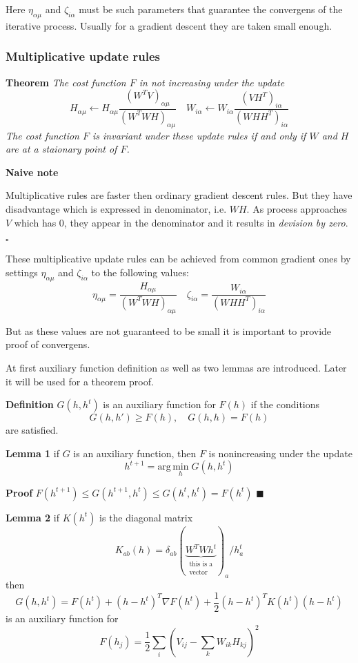\documentclass[oneside, final, 14pt]{extarticle}
\begin{document}
Here $\eta_{\alpha\mu}$ and $\zeta_{i\alpha}$ must be such parameters
that guarantee the convergens of the iterative process.
Usually for a gradient descent they are taken small enough.

\subsubsection{Multiplicative update rules}

\textbf{Theorem} \textit{ The cost function $F$ in not increasing under
the update
\[
  H_{\alpha\mu} \leftarrow H_{\alpha\mu}
  \frac{(W^TV)_{\alpha\mu}}{(W^TWH)_{\alpha\mu}} \quad
  W_{i\alpha} \leftarrow W_{i\alpha}
  \frac{(VH^T)_{i\alpha}}{(WHH^T)_{i\alpha}}
\]
The cost function $F$ is invariant under these update rules if and only if
$W$ and $H$ are at a staionary point of $F$.
}

\textbf{Naive note}

Multiplicative rules are faster
then ordinary gradient descent rules.
But they have disadvantage which is expressed
in denominator, i.e. $WH$. As process approaches
$V$ which has 0, they appear in the denominator
and it results in {\it devision by zero}.

$\square$

These multiplicative update rules can be achieved from common gradient
ones by settings $\eta_{\alpha\mu}$ and $\zeta_{i\alpha}$ to
the following values:
\[
  \eta_{\alpha\mu} =
  \frac {H_{\alpha\mu}}
        {(W^TWH)_{\alpha\mu}} \quad
  \zeta_{i\alpha} =
  \frac {W_{i\alpha}}
        {(WHH^T)_{i\alpha}}
\]

But as these values are not guaranteed to be small it is important
to provide proof of convergens.

At first auxiliary function definition as well as two lemmas
are introduced. Later it will be used
for a theorem proof.

\textbf{Definition} $G(h,h^t)$ is an auxiliary function for $F(h)$ if the
conditions
\[
  G(h,h') \geqslant F(h), \quad G(h,h) = F(h)
\]
are satisfied.

\textbf{Lemma 1} if $G$ is an auxiliary function,
then $F$ is nonincreasing under the update
\[
  h^{t+1} = \text{arg} \, \underset{h}{\text{min}} \; G(h,h^t)
\]

\textbf{Proof}
$F(h^{t+1}) \leqslant G(h^{t+1},h^t) \leqslant G(h^t,h^t) = F(h^t)$
$\blacksquare$

\textbf{Lemma 2} if $K(h^t)$ is the diagonal matrix
\[
  K_{ab}(h) =
  \delta_{ab}
  (\underbrace{W^T W h^t}
    _{\substack{\text{this is a}\\ \text{vector}}}
  )_a / h_a^t
\]
then
\begin{equation}\label{E:auxghht}
  G(h,h^t) = F(h^t) + (h - h^t)^T \nabla F(h^t)
    + \frac{1}{2} (h - h^t)^T K(h^t) (h - h^t)
\end{equation}
is an auxiliary function for
\[
  F(h_j) = \frac{1}{2} \sum_{i}
  \left(
    V_{ij} - \sum_{k}W_{ik}H_{kj}
  \right)^2
\]
\end{document}
